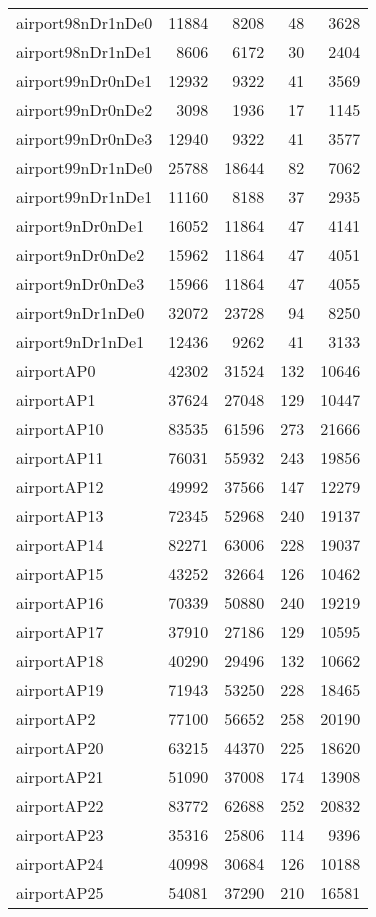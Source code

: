 \begin{tabular}{lrrrr}
airport98nDr1nDe0 & 11884 & 8208 & 48 & 3628 \\
airport98nDr1nDe1 & 8606 & 6172 & 30 & 2404 \\
airport99nDr0nDe1 & 12932 & 9322 & 41 & 3569 \\
airport99nDr0nDe2 & 3098 & 1936 & 17 & 1145 \\
airport99nDr0nDe3 & 12940 & 9322 & 41 & 3577 \\
airport99nDr1nDe0 & 25788 & 18644 & 82 & 7062 \\
airport99nDr1nDe1 & 11160 & 8188 & 37 & 2935 \\
airport9nDr0nDe1 & 16052 & 11864 & 47 & 4141 \\
airport9nDr0nDe2 & 15962 & 11864 & 47 & 4051 \\
airport9nDr0nDe3 & 15966 & 11864 & 47 & 4055 \\
airport9nDr1nDe0 & 32072 & 23728 & 94 & 8250 \\
airport9nDr1nDe1 & 12436 & 9262 & 41 & 3133 \\
airportAP0 & 42302 & 31524 & 132 & 10646 \\
airportAP1 & 37624 & 27048 & 129 & 10447 \\
airportAP10 & 83535 & 61596 & 273 & 21666 \\
airportAP11 & 76031 & 55932 & 243 & 19856 \\
airportAP12 & 49992 & 37566 & 147 & 12279 \\
airportAP13 & 72345 & 52968 & 240 & 19137 \\
airportAP14 & 82271 & 63006 & 228 & 19037 \\
airportAP15 & 43252 & 32664 & 126 & 10462 \\
airportAP16 & 70339 & 50880 & 240 & 19219 \\
airportAP17 & 37910 & 27186 & 129 & 10595 \\
airportAP18 & 40290 & 29496 & 132 & 10662 \\
airportAP19 & 71943 & 53250 & 228 & 18465 \\
airportAP2 & 77100 & 56652 & 258 & 20190 \\
airportAP20 & 63215 & 44370 & 225 & 18620 \\
airportAP21 & 51090 & 37008 & 174 & 13908 \\
airportAP22 & 83772 & 62688 & 252 & 20832 \\
airportAP23 & 35316 & 25806 & 114 & 9396 \\
airportAP24 & 40998 & 30684 & 126 & 10188 \\
airportAP25 & 54081 & 37290 & 210 & 16581 \\

\end{tabular}
